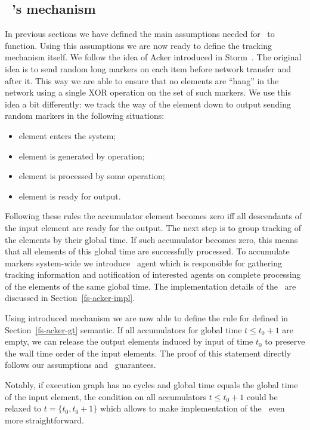 \subsection{\tracker\ 's mechanism} \label{tracker_mechanism}
In previous sections we have defined the main assumptions needed for \tracker\ to function. Using this assumptions we are now ready to define the tracking mechanism itself. We follow the idea of Acker introduced in Storm~\cite{Toshniwal:2014:STO:2588555.2595641}. The original idea is to send random long markers on each item before network transfer and after it. This way we are able to ensure that no elements are ``hang'' in the network using a single XOR operation on the set of such markers. We use this idea a bit differently: we track the way of the element down to output sending random markers in the following situations:
\begin{itemize}
    \item element enters the system;
    \item element is generated by operation;
    \item element is processed by some operation;
    \item element is ready for output.
\end{itemize}
Following these rules the accumulator element becomes zero iff all descendants of the input element are ready for the output. The next step is to group tracking of the elements by their global time. If such accumulator becomes zero, this means that all elements of this global time are successfully processed. To accumulate markers system-wide we introduce \tracker\ agent which is responsible for gathering tracking information and notification of interested agents on complete processing of the elements of the same global time. The implementation details of the \tracker\ are discussed in Section~\ref{fs-acker-impl}.

Using introduced mechanism we are now able to define the rule for defined in Section~\ref{fs-acker-gt} semantic. If all accumulators for global time $t \le t_0 + 1$ are empty, we can release the output elements induced by input of time $t_0$ to preserve the wall time order of the input elements. The proof of this statement directly follows our assumptions and \tracker\ guarantees.

Notably, if execution graph has no cycles and global time equals the global time of the input element, the condition on all accumulators $t \le t_0 + 1$ could be relaxed to $t = \{t_0, t_0 + 1\}$ which allows to make implementation of the \tracker\ even more straightforward.

